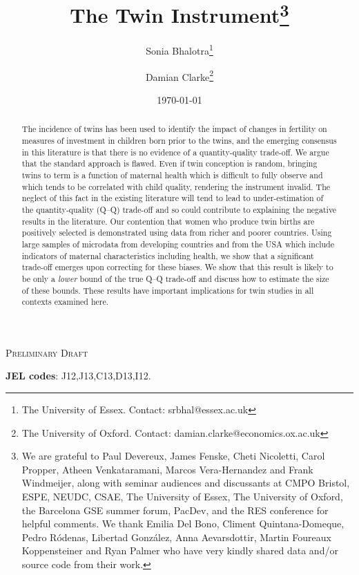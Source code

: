 \documentclass[subeqn]{article}
\title{The Twin Instrument\footnote{We are grateful to Paul Devereux, James 
Fenske, Cheti Nicoletti, Carol Propper, Atheen Venkataramani, Marcos 
Vera-Hernandez and Frank Windmeijer, along with seminar audiences and discussants 
at CMPO Bristol, ESPE, NEUDC, CSAE, The University of Essex, The University of 
Oxford, the Barcelona GSE summer forum, PacDev, and the RES conference for helpful 
comments.  We thank Emilia Del Bono, Climent Quintana-Domeque, Pedro R\'odenas, 
Libertad Gonz\'alez, Anna Aevarsdottir, Martin Foureaux Koppensteiner and Ryan 
Palmer who have very kindly shared data and/or source code from their work.}}
\author{Sonia Bhalotra\thanks{The University of Essex.
Contact: srbhal@essex.ac.uk} 
\and Damian Clarke\thanks{The University of Oxford. 
Contact: damian.clarke@economics.ox.ac.uk}}
\date{\today}
\begin{document}
\begin{spacing}{1.4}

\maketitle
\vspace{-1cm}
\begin{center}{\Large\textsc{Preliminary Draft}}\end{center}
\begin{abstract}
 The incidence of twins has been used to identify the impact of changes in 
 fertility on measures of investment in children born prior to the twins, and
 the emerging consensus in this literature is that there is no evidence of a
 quantity-quality trade-off. We argue that the standard approach is flawed.
 Even if twin conception is random, bringing twins to term is a function of
 maternal health which is difficult to fully observe and which tends to be
 correlated with child quality, rendering the instrument invalid. The neglect
 of this fact in the existing literature will tend to lead to under-estimation 
 of the quantity-quality (Q--Q) trade-off and so could contribute to explaining 
 the negative results in the literature. Our contention that women who produce 
 twin births are positively selected is demonstrated using data from richer and 
 poorer countries. Using large samples of microdata from developing countries 
 and from the USA which include indicators of maternal characteristics including
 health, we show that a significant trade-off emerges upon correcting for these
 biases. We show that this result is likely to be only a \emph{lower} bound of
 the true Q--Q trade-off and discuss how to estimate the size of these bounds.
 These results have important implications for twin studies in all contexts
 examined here.
\\
\end{abstract}
\hspace{4mm}\textbf{\small JEL codes}: J12,J13,C13,D13,I12. \\

\newpage

\end{spacing}
\end{document}
